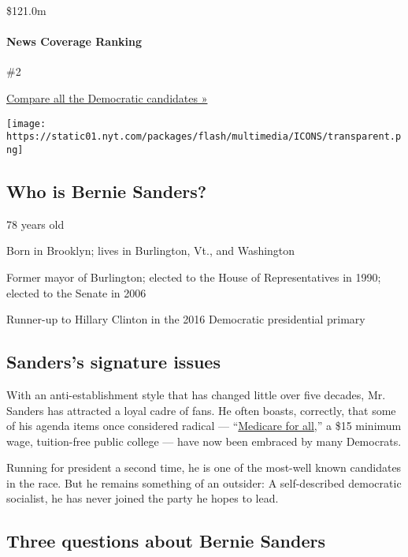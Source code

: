 \$121.0m

\hypertarget{news-coverage-ranking}{%
\paragraph{News Coverage Ranking}\label{news-coverage-ranking}}

\#2

\href{https://www.nytimes.com/interactive/2020/us/elections/democratic-polls.html}{Compare
all the Democratic candidates »}

\texttt{[image: https://static01.nyt.com/packages/flash/multimedia/ICONS/transparent.png]}

\hypertarget{who-is-bernie-sanders}{%
\subsection{Who is Bernie Sanders?}\label{who-is-bernie-sanders}}

78 years old

Born in Brooklyn; lives in Burlington, Vt., and Washington

Former mayor of Burlington; elected to the House of Representatives in
1990; elected to the Senate in 2006

Runner-up to Hillary Clinton in the 2016 Democratic presidential primary

\hypertarget{sanderss-signature-issues}{%
\subsection{Sanders's signature
issues}\label{sanderss-signature-issues}}

With an anti-establishment style that has changed little over five
decades, Mr. Sanders has attracted a loyal cadre of fans. He often
boasts, correctly, that some of his agenda items once considered radical
---
``\href{https://www.nytimes.com/2019/06/27/us/politics/bernie-sanders-medicare-for-all.html}{Medicare
for all},'' a \$15 minimum wage, tuition-free public college --- have
now been embraced by many Democrats.

Running for president a second time, he is one of the most-well known
candidates in the race. But he remains something of an outsider: A
self-described democratic socialist, he has never joined the party he
hopes to lead.

\hypertarget{three-questions-about-bernie-sanders}{%
\subsection{Three questions about Bernie
Sanders}\label{three-questions-about-bernie-sanders}}

